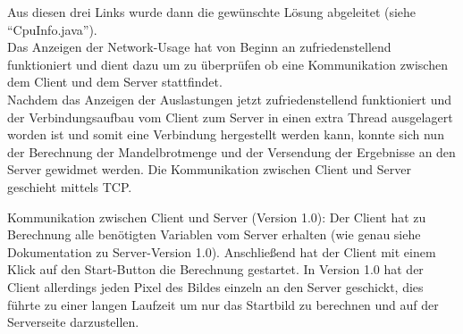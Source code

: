 \documentclass[12pt, onecolumn, notitlepage]{scrartcl}
\begin{document}
Aus diesen drei Links wurde dann die gewünschte Lösung abgeleitet (siehe \enquote{CpuInfo.java}).\\
Das Anzeigen der Network-Usage hat von Beginn an zufriedenstellend funktioniert und dient dazu um zu überprüfen ob eine Kommunikation zwischen dem Client und dem Server stattfindet.\\
Nachdem das Anzeigen der Auslastungen jetzt zufriedenstellend funktioniert und der Verbindungsaufbau vom Client zum Server in einen extra Thread ausgelagert worden ist und somit eine Verbindung hergestellt werden kann, konnte sich nun der Berechnung der Mandelbrotmenge und der Versendung der Ergebnisse an den Server gewidmet werden. Die Kommunikation zwischen Client und Server geschieht mittels TCP. \par
Kommunikation zwischen Client und Server (Version 1.0): 
Der Client hat zu Berechnung alle benötigten Variablen vom Server erhalten (wie genau siehe Dokumentation zu Server-Version 1.0). Anschließend hat der Client mit einem Klick auf den Start-Button die Berechnung gestartet. In Version 1.0 hat der Client allerdings jeden Pixel des Bildes einzeln an den Server geschickt, dies führte zu einer langen Laufzeit um nur das Startbild zu berechnen und auf der Serverseite darzustellen.\par
\end{document}
